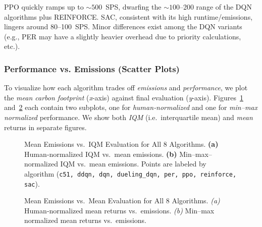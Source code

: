 PPO quickly ramps up to $\sim500$~SPS, dwarfing the $\sim100$--200 range of the DQN 
algorithms plus REINFORCE. 
SAC, consistent with its high runtime/emissions, lingers around 80--100~SPS. 
Minor differences exist among the DQN variants (e.g., PER may have a slightly heavier overhead 
due to priority calculations, etc.).

\subsubsection{Performance vs. Emissions (Scatter Plots)}
To visualize how each algorithm trades off \emph{emissions} and \emph{performance},
we plot the \textit{mean carbon footprint} (\textit{x}-axis) against final evaluation 
(\textit{y}-axis). Figures~\ref{fig:scatter_all_iqmean} and~\ref{fig:scatter_all_mean}
each contain two subplots, one for \textit{human‐normalized} and one for 
\textit{min--max normalized} performance. We show both \textit{IQM} (i.e.\ interquartile mean) 
and \textit{mean} returns in separate figures.

\begin{figure} 
	\centering
	\quad
	\caption{Mean Emissions vs.\ IQM Evaluation for All 8 Algorithms.
		\textbf{(a)} Human‐normalized IQM vs.\ mean emissions. 
		\textbf{(b)} Min--max–normalized IQM vs.\ mean emissions. 
		Points are labeled by algorithm (\texttt{c51, ddqn, dqn, dueling\_dqn, per, ppo, reinforce, sac}).}
	\label{fig:scatter_all_iqmean}
\end{figure}

\begin{figure} 
	\centering
	\quad
	\caption{Mean Emissions vs.\ Mean Evaluation for All 8 Algorithms.
		\textit{(a)} Human‐normalized mean returns vs.\ emissions. 
		\textit{(b)} Min--max normalized mean returns vs.\ emissions.}
	\label{fig:scatter_all_mean}
\end{figure}


